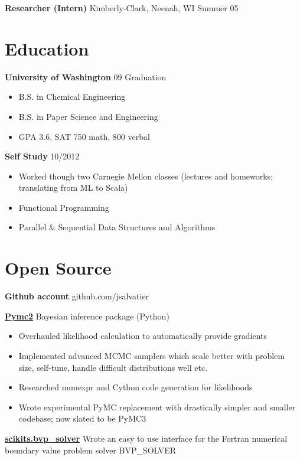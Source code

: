 \documentclass[margin]{res}
\begin{document}
\begin{resume}
  {\bf Researcher (Intern)} Kimberly-Clark, Neenah, WI \hfill  Summer 05

\section{Education} 
  {\bf University of Washington} \hfill 09 Graduation 
    \begin{itemize} \itemsep -2pt
      \item B.S. in Chemical Engineering
      \item B.S. in Paper Science and Engineering
      \item GPA 3.6, SAT 750 math, 800 verbal
    \end{itemize}
  {\bf Self Study} \hfill 10/2012
    \begin{itemize} \itemsep -2pt
      \item Worked though two Carnegie Mellon classes (lectures and homeworks; translating from ML to Scala)
        \item Functional Programming
        \item Parallel \& Sequential Data Structures and Algorithms 
    \end{itemize}
    
   
  \section{Open Source}
    {\bf Github account} github.com/jsalvatier 

    {\bf \href{https://github.com/pymc-devs/pymc#readme}{Pymc2}} Bayesian inference package (Python) 
      \vspace{6pt}
    \begin{itemize} \itemsep -2pt
      \item Overhauled likelihood calculation to automatically provide gradients 
      \item Implemented advanced MCMC samplers which scale better with problem size, self-tune, handle difficult distributions well etc.
      \item Researched numexpr and Cython code generation for likelihoods
      \item Wrote experimental PyMC replacement with drastically simpler and smaller codebase; now slated to be PyMC3
     \end{itemize}

     {\bf \href{packages.python.org/scikits.bvp\_solver}{scikits.bvp\_solver}} Wrote an easy to use interface for the Fortran numerical \\
      boundary value problem solver BVP\_SOLVER \\ 
      \vspace{6pt}

\end{resume} 
\end{document}
